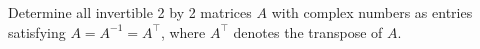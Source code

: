 Determine all invertible 2 by 2 matrices $A$ with complex numbers as entries
satisfying $A = A^{-1} = A^\top$, where $A^\top$ denotes the transpose of $A$.
